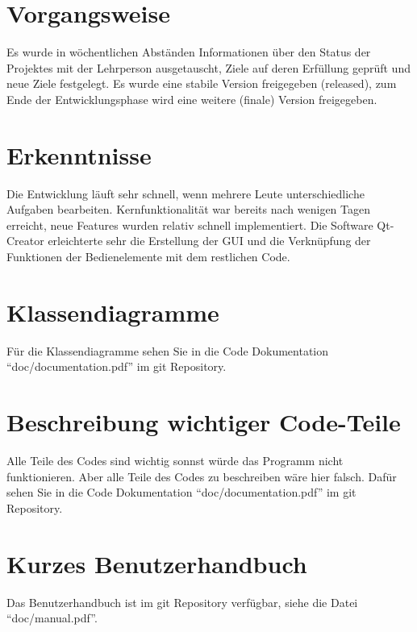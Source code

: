 \documentclass[a4paper,ngerman,headsepline]{scrreprt}
\begin{document}
\section*{Vorgangsweise}
Es wurde in wöchentlichen Abständen Informationen über den Status der Projektes mit der Lehrperson ausgetauscht, Ziele auf deren Erfüllung geprüft und neue Ziele festgelegt. Es wurde eine stabile Version freigegeben (released), zum Ende der Entwicklungsphase wird eine weitere (finale) Version freigegeben.


\section*{Erkenntnisse}
Die Entwicklung läuft sehr schnell, wenn mehrere Leute unterschiedliche Aufgaben bearbeiten.
Kernfunktionalität war bereits nach wenigen Tagen erreicht, neue Features wurden relativ schnell implementiert. Die Software Qt-Creator erleichterte sehr die Erstellung der GUI und die Verknüpfung der Funktionen der Bedienelemente mit dem restlichen Code.

\section*{Klassendiagramme}
Für die Klassendiagramme sehen Sie in die Code Dokumentation \enquote{doc/documentation.pdf} im git Repository.

\section*{Beschreibung wichtiger Code-Teile}
Alle Teile des Codes sind wichtig sonnst würde das Programm nicht funktionieren. Aber alle Teile des Codes zu beschreiben wäre hier falsch. Dafür sehen Sie in die Code Dokumentation \enquote{doc/documentation.pdf} im git Repository.

\section*{Kurzes Benutzerhandbuch}
Das Benutzerhandbuch ist im git Repository verfügbar, siehe die Datei \enquote{doc/manual.pdf}.

\end{document}
